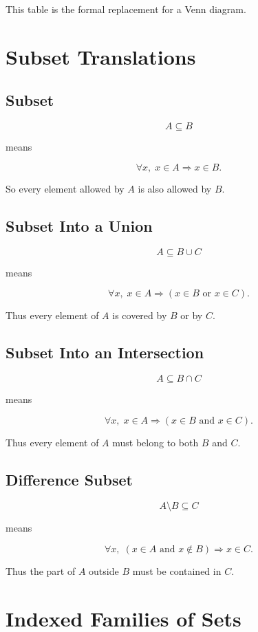 \documentclass{article}
\begin{document}
	This table is the formal replacement for a Venn diagram.
	
	\section{Subset Translations}
	
	\subsection{Subset}
	
	$$
	A \subseteq B
	$$
	
	means
	
	$$
	\forall x,\; x \in A \Rightarrow x \in B.
	$$
	
	So every element allowed by $A$ is also allowed by $B$.
	
	\subsection{Subset Into a Union}
	
	$$
	A \subseteq B \cup C
	$$
	
	means
	
	$$
	\forall x,\; x \in A \Rightarrow (x \in B \text{ or } x \in C).
	$$
	
	Thus every element of $A$ is covered by $B$ or by $C$.
	
	\subsection{Subset Into an Intersection}
	
	$$
	A \subseteq B \cap C
	$$
	
	means
	
	$$
	\forall x,\; x \in A \Rightarrow (x \in B \text{ and } x \in C).
	$$
	
	Thus every element of $A$ must belong to both $B$ and $C$.
	
	\subsection{Difference Subset}
	
	$$
	A \setminus B \subseteq C
	$$
	
	means
	
	$$
	\forall x,\; (x \in A \text{ and } x \notin B) \Rightarrow x \in C.
	$$
	
	Thus the part of $A$ outside $B$ must be contained in $C$.
	
	\section{Indexed Families of Sets}
	
\end{document}
